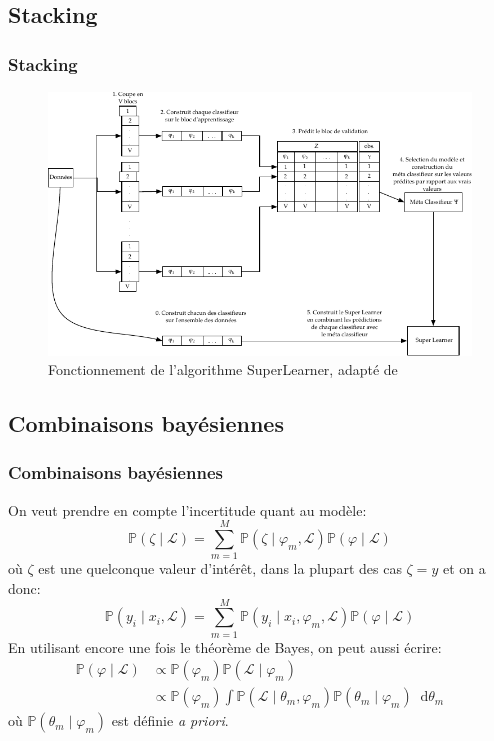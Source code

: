 \documentclass[dvipsnames,10pt]{beamer}
\newcommand*\diff{\mathop{}\!\mathrm{d}}
\theoremstyle{plain}
\theoremstyle{definition}
\begin{document}
\subsection{Stacking}
\begin{frame}
\frametitle{Stacking}
\begin{figure}[H]
    \includegraphics[scale=0.85]{../images/Superlearner.pdf}
    \caption{Fonctionnement de l'algorithme SuperLearner, adapté de \citet{VanderLaan2007a}}
\end{figure}
\end{frame}

\subsection{Combinaisons bayésiennes}

\begin{frame}
\frametitle{Combinaisons bayésiennes}
On veut prendre en compte l'incertitude quant au  modèle:
\begin{equation}
    \mathbb{P} ( \zeta \mid \mathcal{L} ) = \sum_{m=1}^M \mathbb{P} (\zeta \mid \varphi_m , \mathcal{L}) \mathbb{P} ( \varphi \mid \mathcal{L} )
    \label{equ:bma}
\end{equation} 
où $\zeta$ est une quelconque valeur d'intérêt, dans la plupart des cas $\zeta = y$ et on a donc:
\begin{equation}
    \mathbb{P} ( y_i \mid x_i , \mathcal{L} ) = \sum_{m=1}^M \mathbb{P} (y_i \mid x_i,  \varphi_m , \mathcal{L}) \mathbb{P} ( \varphi \mid \mathcal{L} )
    \label{equ:bma2}
\end{equation} 
En utilisant encore une fois le théorème de Bayes, on peut aussi écrire:
\begin{align}
    \mathbb{P} ( \varphi \mid \mathcal{L} ) &\propto \mathbb{P} ( \varphi_m ) \mathbb{P} ( \mathcal{L} \mid \varphi_m ) \\
    &\propto \mathbb{P} ( \varphi_m ) \int \mathbb{P} ( \mathcal{L} \mid \theta_m , \varphi_m ) \mathbb{P} ( \theta_m \mid \varphi_m ) \diff \theta_m
    \label{equ:bayes}
\end{align}
où $\mathbb{P} ( \theta_m \mid \varphi_m )$ est définie \emph{a priori}.
\end{frame}
\end{document}
